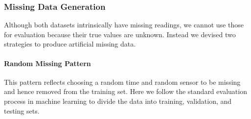 




\subsubsection{Missing Data Generation}


Although both datasets intrinsically have missing readings, we cannot use those for evaluation because their true values are unknown.
Instead we devised two strategies to produce artificial missing data.
\paragraph*{Random Missing Pattern}

This pattern reflects choosing a random time and random sensor to be missing and hence removed from the training set.
Here we follow the standard evaluation process in machine learning to divide the data into training, validation, and testing sets.

